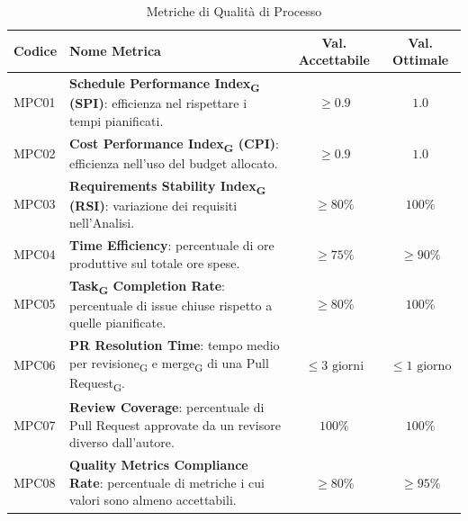 \vspace{0.5cm}

\begin{table}[H]
    \centering
    \renewcommand{\arraystretch}{1.3}
    \begin{tabularx}{\textwidth}{|l|X|c|c|}
        \hline
        \rowcolor{primarycolor!10}
        \textbf{Codice} & \textbf{Nome Metrica} & \textbf{Val. Accettabile} & \textbf{Val. Ottimale} \\
        \hline
        MPC01 & \textbf{Schedule Performance Index\textsubscript{G} (SPI)}: efficienza nel rispettare i tempi pianificati. & $\ge 0.9$ & $1.0$ \\
        \hline
        MPC02 & \textbf{Cost Performance Index\textsubscript{G} (CPI)}: efficienza nell'uso del budget allocato. & $\ge 0.9$ & $1.0$ \\
        \hline
        MPC03 & \textbf{Requirements Stability Index\textsubscript{G} (RSI)}: variazione dei requisiti nell'Analisi. & $\ge 80\%$ & $100\%$ \\
        \hline
        MPC04 & \textbf{Time Efficiency}: percentuale di ore produttive sul totale ore spese. & $\ge 75\%$ & $\ge 90\%$ \\
        \hline
        MPC05 & \textbf{Task\textsubscript{G} Completion Rate}: percentuale di issue chiuse rispetto a quelle pianificate. & $\ge 80\%$ & $100\%$ \\
        \hline
        MPC06 & \textbf{PR Resolution Time}: tempo medio per revisione\textsubscript{G} e merge\textsubscript{G} di una Pull Request\textsubscript{G}. & $\le 3 \text{ giorni}$ & $\le 1 \text{ giorno}$ \\
        \hline
        MPC07 & \textbf{Review Coverage}: percentuale di Pull Request approvate da un revisore diverso dall'autore. & $100\%$ & $100\%$ \\
        \hline
        MPC08 & \textbf{Quality Metrics Compliance Rate}: percentuale di metriche i cui valori sono almeno accettabili. & $\ge 80\%$ & $\ge 95\%$ \\
        \hline
    \end{tabularx}
    \caption{Metriche di Qualità di Processo}
\end{table}

\vspace{0.5cm}
